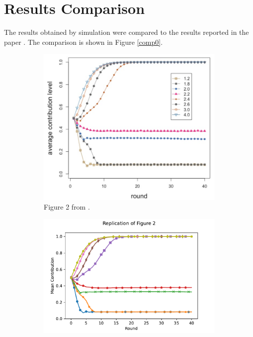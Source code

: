 \section{Results Comparison}
The results obtained by simulation were compared to the results reported in the paper \cite{RN49}. The comparison is shown in Figure \ref{comp0}. \\

\FloatBarrier 
\begin{figure}[!h]
  \begin{subfigure}[b]{0.45\textwidth}
    \includegraphics[width=\textwidth]{images/TAfig2_real.png}
    \caption{Figure 2 from \cite{RN49}. }
    \label{TAfig2_real}
  \end{subfigure}
  \hfill
  \begin{subfigure}[b]{0.45\textwidth}
    \includegraphics[width=1.25\textwidth]{images/final_TA_fig2.pdf}

\end{subfigure}
\end{figure}
